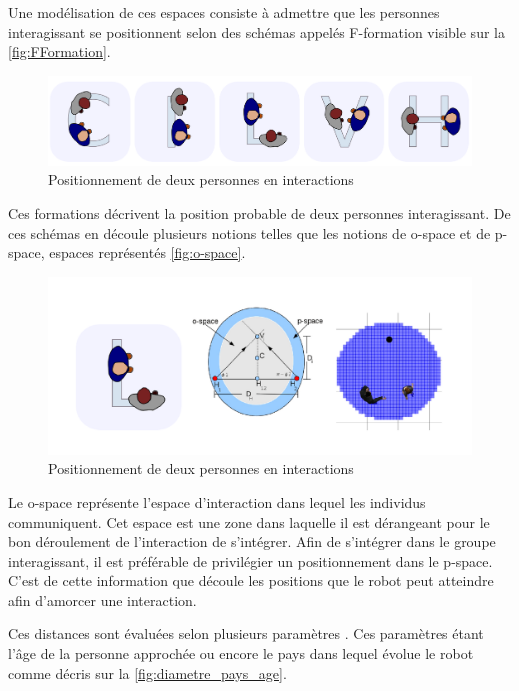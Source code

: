 Une modélisation de ces espaces consiste à admettre que les personnes interagissant se positionnent selon des schémas appelés F-formation visible sur la \autoref{fig:FFormation}.

\begin{figure}[ht!]
    \centering
    \includegraphics[width=\linewidth]{Rapport/images/FFormations.PNG}
    \caption{Positionnement de deux personnes en interactions}
    \label{fig:FFormation}
\end{figure}

Ces formations décrivent la position probable de deux personnes interagissant. De ces schémas en découle plusieurs notions telles que les notions de o-space et de p-space, espaces représentés \autoref{fig:o-space}.

\begin{figure}[ht!]
    \centering
    \includegraphics[width=\linewidth]{Rapport/images/ZZZ.PNG}
    \caption{Positionnement de deux personnes en interactions}
    \label{fig:o-space}
\end{figure}

Le o-space représente l'espace d'interaction dans lequel les individus communiquent. Cet espace est une zone dans laquelle il est dérangeant pour le bon déroulement de l'interaction de s'intégrer. Afin de s'intégrer dans le groupe interagissant, il est préférable de privilégier un positionnement dans le p-space. C'est de cette information que découle les positions que le robot peut atteindre afin d'amorcer une interaction.

Ces distances sont évaluées selon plusieurs paramètres \cite{joosse_cultural_2014}. Ces paramètres étant l'âge de la personne approchée ou encore le pays dans lequel évolue le robot comme décris sur la \autoref{fig:diametre_pays_age}.

